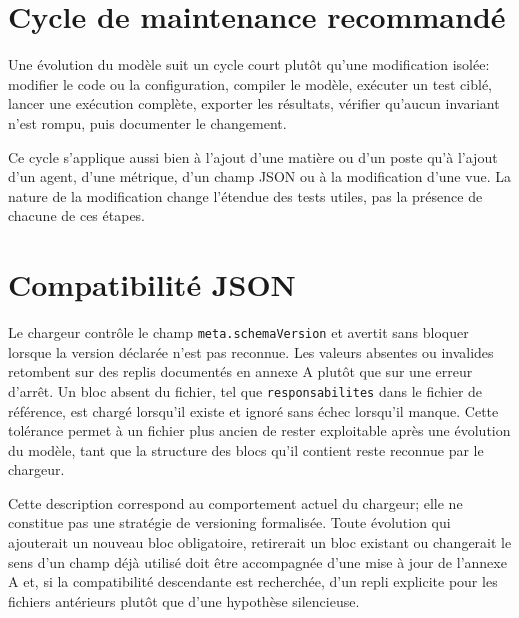 

\section{Cycle de maintenance recommandé}

Une évolution du modèle suit un cycle court plutôt qu'une modification isolée: modifier le code ou la configuration, compiler le modèle, exécuter un test ciblé, lancer une exécution complète, exporter les résultats, vérifier qu'aucun invariant n'est rompu, puis documenter le changement.


Ce cycle s'applique aussi bien à l'ajout d'une matière ou d'un poste qu'à l'ajout d'un agent, d'une métrique, d'un champ JSON ou à la modification d'une vue. La nature de la modification change l'étendue des tests utiles, pas la présence de chacune de ces étapes.

\section{Compatibilité JSON}

Le chargeur contrôle le champ \texttt{meta.schemaVersion} et avertit sans bloquer lorsque la version déclarée n'est pas reconnue. Les valeurs absentes ou invalides retombent sur des replis documentés en annexe A plutôt que sur une erreur d'arrêt. Un bloc absent du fichier, tel que \texttt{responsabilites} dans le fichier de référence, est chargé lorsqu'il existe et ignoré sans échec lorsqu'il manque. Cette tolérance permet à un fichier plus ancien de rester exploitable après une évolution du modèle, tant que la structure des blocs qu'il contient reste reconnue par le chargeur.

Cette description correspond au comportement actuel du chargeur; elle ne constitue pas une stratégie de versioning formalisée. Toute évolution qui ajouterait un nouveau bloc obligatoire, retirerait un bloc existant ou changerait le sens d'un champ déjà utilisé doit être accompagnée d'une mise à jour de l'annexe A et, si la compatibilité descendante est recherchée, d'un repli explicite pour les fichiers antérieurs plutôt que d'une hypothèse silencieuse.


